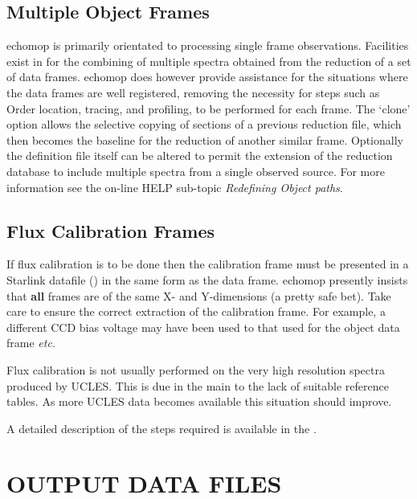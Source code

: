 \subsection{Multiple Object Frames}

{\sc echomop} is primarily orientated to processing single frame observations.
Facilities exist in  for the combining of multiple
spectra obtained from the reduction of a set of data frames.  {\sc echomop}
does however provide
assistance for the situations where the data frames are well registered,
removing the necessity for steps such as Order location, tracing, and
profiling, to be performed for each frame.  The `clone' option allows the
selective copying of sections of a previous reduction file, which then
becomes the baseline for the reduction of another similar frame.
Optionally the definition file itself can be altered to permit the
extension of the reduction database to include multiple spectra
from a single observed source.
For more information see the on-line HELP sub-topic
{\sl Redefining Object paths}.


\subsection{Flux Calibration Frames}

If flux calibration is to be done then the calibration frame must be
presented in a Starlink datafile () in the same form
as the data frame.
{\sc echomop} presently insists that {\bf all} frames are of the same X- and
Y-dimensions (a pretty safe bet).  Take care to ensure
the correct extraction of the calibration frame.  For example, a
different CCD bias voltage may have been used to that used for the
object data frame {\it etc.}

Flux calibration is not usually performed on the very high resolution
spectra produced by UCLES.  This is due in the main to the lack of suitable
reference tables.  As more UCLES data becomes available this situation
should improve.

A detailed description of the steps required is available in the
 .


\section{OUTPUT DATA FILES}

